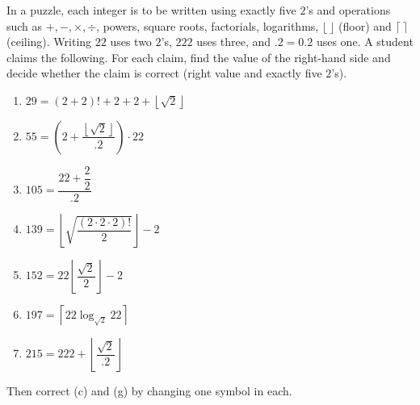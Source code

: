 In a puzzle, each integer is to be written using exactly five $2$'s and operations such as $+,-,\times,\div$, powers, square roots, factorials, logarithms, $\lfloor\ \rfloor$ (floor) and $\lceil\ \rceil$ (ceiling). Writing $22$ uses two $2$'s, $222$ uses three, and $.2=0.2$ uses one. A student claims the following. For each claim, find the value of the right-hand side and decide whether the claim is correct (right value and exactly five $2$'s).
\begin{enumerate}
\item[(a)] $29=(2+2)!+2+2+\left\lfloor\sqrt2\right\rfloor$
\item[(b)] $55=\left(2+\dfrac{\left\lfloor\sqrt2\right\rfloor}{.2}\right)\cdot22$
\item[(c)] $105=\dfrac{22+\dfrac22}{.2}$
\item[(d)] $139=\left\lfloor\sqrt{\dfrac{(2\cdot2\cdot2)!}{2}}\right\rfloor-2$
\item[(e)] $152=22\left\lfloor\dfrac{\sqrt2}{2}\right\rfloor-2$
\item[(f)] $197=\left\lceil22\log_{\sqrt2}22\right\rceil$
\item[(g)] $215=222+\left\lfloor\dfrac{\sqrt2}{.2}\right\rfloor$
\end{enumerate}
Then correct (c) and (g) by changing one symbol in each.
